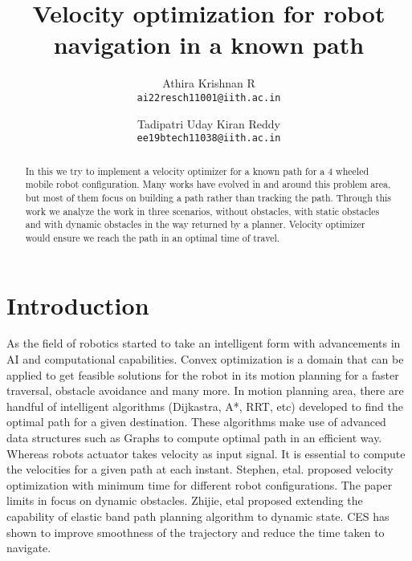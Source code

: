\documentclass[10pt,twocolumn,letterpaper]{article}
\begin{document}
\title{ Velocity optimization for robot navigation in a known path}

\author{Athira Krishnan R \\
{\tt\small ai22resch11001@iith.ac.in}
\and
Tadipatri Uday Kiran Reddy \\
{\tt\small ee19btech11038@iith.ac.in}}



\maketitle

\begin{abstract}
   In this we try to implement a velocity optimizer for a known path for a 4 wheeled mobile robot configuration. Many works have evolved in and around this problem area, but most of them focus on building a path rather than tracking the path. Through this work we analyze the work in three scenarios, without obstacles, with static obstacles and with dynamic obstacles in the way returned by a planner. Velocity optimizer would ensure we reach the path in an optimal time of travel.
\end{abstract}

\section{Introduction}

As the field of robotics started to take an intelligent form with advancements in AI and computational capabilities. Convex optimization is a domain that can be applied to get feasible solutions for the robot in its motion planning for a faster traversal, obstacle avoidance and many more. In motion planning area, there are handful of intelligent algorithms (Dijkastra, A*, RRT, etc) developed to find the optimal path for a given destination. These algorithms make use of advanced data structures such as Graphs to compute optimal path in an efficient way. Whereas robots actuator takes velocity as input signal. It is essential to compute the velocities for a given path at each instant. Stephen, etal. \cite{lipp2014minimum} proposed velocity optimization with minimum time for different robot configurations. The paper limits in focus on dynamic obstacles. Zhijie, etal \cite{zhu2015convex} proposed extending the capability of elastic band path planning algorithm to dynamic state. CES has shown to improve smoothness of the trajectory and reduce the time taken to navigate.
\end{document}
